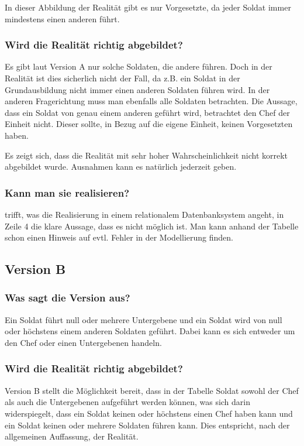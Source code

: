 In dieser Abbildung der Realität gibt es nur Vorgesetzte, da jeder Soldat immer mindestens einen anderen führt.

\subsubsection{Wird die Realität richtig abgebildet?}
Es gibt laut Version A nur solche Soldaten, die andere führen. Doch in der Realität ist dies sicherlich nicht der Fall, da z.B. ein Soldat in der Grundausbildung nicht immer  einen anderen Soldaten führen wird. In der anderen Fragerichtung muss man ebenfalls alle Soldaten betrachten. Die Aussage, dass ein Soldat von genau einem anderen geführt wird, betrachtet den Chef der Einheit nicht. Dieser sollte, in Bezug auf die eigene Einheit, keinen Vorgesetzten haben.

Es zeigt sich, dass die Realität mit sehr hoher Wahrscheinlichkeit nicht korrekt abgebildet wurde. Ausnahmen kann es natürlich jederzeit geben.
\subsubsection{Kann man sie realisieren?}
 trifft, was die Realisierung in einem relationalem Datenbanksystem angeht, in Zeile 4 die klare Aussage, dass es nicht möglich ist. Man kann anhand der Tabelle schon einen Hinweis auf evtl. Fehler in der Modellierung finden.
\subsection{Version B}
\subsubsection{Was sagt die Version aus?}
Ein Soldat führt null oder mehrere Untergebene und ein Soldat wird von null oder höchstens einem anderen Soldaten geführt. Dabei kann es sich entweder um den Chef oder einen Untergebenen handeln.
\subsubsection{Wird die Realität richtig abgebildet?}
Version B stellt die Möglichkeit bereit, dass in der Tabelle Soldat sowohl der Chef als auch die Untergebenen aufgeführt werden können, was sich darin widerspiegelt, dass ein Soldat keinen oder höchstens einen Chef haben kann und ein Soldat keinen oder mehrere Soldaten führen kann. Dies entspricht, nach der allgemeinen Auffassung, der Realität.
